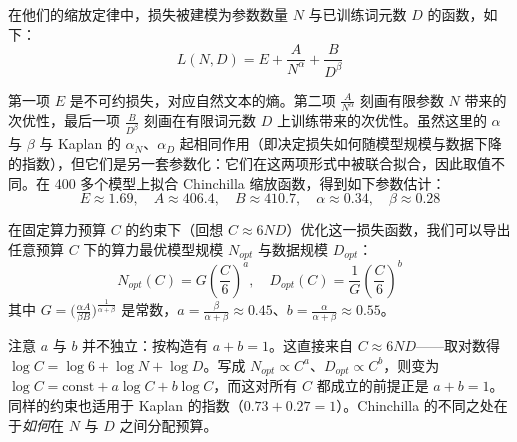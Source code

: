 在他们的缩放定律中，损失被建模为参数数量 $N$ 与已训练词元数 $D$ 的函数，如下：
\begin{equation}
    L(N,D) = E + \frac{A}{N^{\alpha}} + \frac{B}{D^{\beta}}
\end{equation}

第一项 $E$ 是不可约损失，对应自然文本的熵。第二项 $\frac{A}{N^{\alpha}}$ 刻画有限参数 $N$ 带来的次优性，最后一项 $\frac{B}{D^{\beta}}$ 刻画在有限词元数 $D$ 上训练带来的次优性。虽然这里的 $\alpha$ 与 $\beta$ 与 Kaplan 的 $\alpha_N$、$\alpha_D$ 起相同作用（即决定损失如何随模型规模与数据下降的指数），但它们是另一套参数化：它们在这两项形式中被联合拟合，因此取值不同。在 400 多个模型上拟合 Chinchilla 缩放函数，得到如下参数估计：
\begin{equation}
    E \approx 1.69, \quad A \approx 406.4, \quad B \approx 410.7, \quad \alpha \approx 0.34, \quad \beta \approx 0.28
\end{equation}

在固定算力预算 $C$ 的约束下（回想 $C \approx 6ND$）优化这一损失函数，我们可以导出任意预算 $C$ 下的算力最优模型规模 $N_{opt}$ 与数据规模 $D_{opt}$：
\begin{equation}
    N_{opt}(C) = G \left( \frac{C}{6} \right)^a, \quad D_{opt}(C) = \frac{1}{G} \left( \frac{C}{6} \right)^b
\end{equation}
其中 $G=\big(\frac{\alpha A}{\beta B}\big)^{\frac{1}{\alpha + \beta}}$ 是常数，$a = \frac{\beta}{\alpha + \beta} \approx 0.45$、$b = \frac{\alpha}{\alpha + \beta} \approx 0.55$。

注意 $a$ 与 $b$ 并不独立：按构造有 $a+b=1$。这直接来自 $C \approx 6ND$——取对数得 $\log C = \log 6 + \log N + \log D$。写成 $N_{opt} \propto C^a$、$D_{opt} \propto C^b$，则变为 $\log C = \text{const} + a \log C + b \log C$，而这对所有 $C$ 都成立的前提正是 $a+b=1$。同样的约束也适用于 Kaplan 的指数（$0.73 + 0.27 = 1$）。Chinchilla 的不同之处在于\emph{如何}在 $N$ 与 $D$ 之间分配预算。


